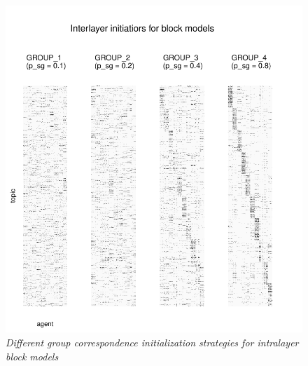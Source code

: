 \begin{figure}[!ht]
    \centering
    \includegraphics[width=\textwidth]{../figures/report/FigS2.pdf}
    \caption{\label{supp:2}
    \textit{Different group correspondence initialization strategies for intralayer block models}
    }
\end{figure}